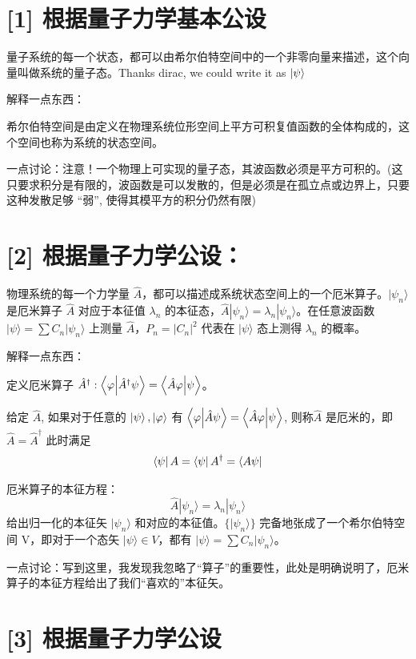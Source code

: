 \section*{[1] 根据量子力学基本公设}

量子系统的每一个状态，都可以由希尔伯特空间中的一个非零向量来描述，这个向量叫做系统的量子态。Thanks dirac, we could write it as $ \ket{\psi} $

解释一点东西：

希尔伯特空间是由定义在物理系统位形空间上平方可积复值函数的全体构成的，这个空间也称为系统的状态空间。

一点讨论：注意！一个物理上可实现的量子态，其波函数必须是平方可积的。(这只要求积分是有限的，波函数是可以发散的，但是必须是在孤立点或边界上，只要这种发散足够 “弱”, 使得其模平方的积分仍然有限)

\section*{[2] 根据量子力学公设：}

物理系统的每一个力学量 $\hat{A}$，都可以描述成系统状态空间上的一个厄米算子。$|\psi_{n}\rangle$ 是厄米算子 $\hat{A}$ 对应于本征值 $\lambda_n$ 的本征态，$\hat{A}|\psi_{n}\rangle=\lambda_n|\psi_{n}\rangle$。在任意波函数 $|\psi\rangle=\sum C_n|\psi_{n}\rangle$ 上测量 $\hat{A}$，$P_n=\left|C_n\right|^2$ 代表在 $|\psi\rangle$ 态上测得 $\lambda_n$ 的概率。

解释一点东西：

定义厄米算子 $\hat{A}^{\dagger}:\bra{\varphi}\ket{\hat{A}^{\dagger}\psi}=\bra{\hat{A}\varphi}\ket{\psi}$。

给定 \(\hat{A}\), 如果对于任意的 \(\ket{\psi},\ket{\varphi}\) 有 $\bra{\varphi}\ket{\hat{A}\psi}=\bra{\hat{A}\varphi}\ket{\psi}$, 则称\(\hat{A}\) 是厄米的，即 $\hat{A}=\hat{A}^{\dagger}$ 此时满足
\[\bra{\psi}A=\bra{\psi}A^{\dagger}=\bra{A\psi}\]

厄米算子的本征方程：
\[\hat{A}|\psi_{n}\rangle=\lambda_n|\psi_{n}\rangle\]
给出归一化的本征矢 $|\psi_{n}\rangle$ 和对应的本征值。$\{|\psi_{n}\rangle\}$ 完备地张成了一个希尔伯特空间 V，即对于一个态矢 $|\psi\rangle\in V$，都有 $|\psi\rangle=\sum C_n|\psi_{n}\rangle$。

一点讨论：写到这里，我发现我忽略了“算子”的重要性，此处是明确说明了，厄米算子的本征方程给出了我们“喜欢的”本征矢。

\section*{[3] 根据量子力学公设}

